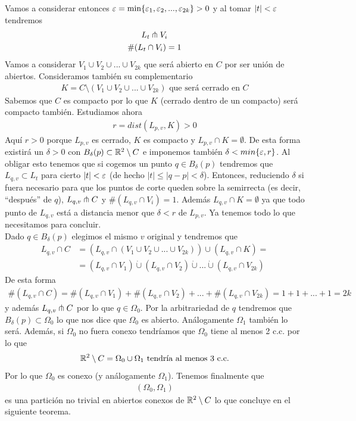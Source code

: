 Vamos a considerar entonces $\varepsilon = \min\{\varepsilon_1, \varepsilon_2, ... , \varepsilon_{2k}\}>0$ y al tomar $|t|<\varepsilon$ tendremos
\begin{gather*}
    L_t \pitchfork V_i\\
    \#(L_t \cap V_i) = 1
\end{gather*}
Vamos a considerar $V_1\cup V_2 \cup ... \cup V_{2k}$ que será abierto en $C$ por ser unión de abiertos. Consideramos también su complementario
\begin{gather*}
    K = C\setminus (V_1\cup V_2 \cup ... \cup V_{2k}) \text{ que será cerrado en $C$}
\end{gather*}
Sabemos que $C$ es compacto por lo que $K$ (cerrado dentro de un compacto) será compacto también. Estudiamos ahora
\begin{gather*}
    r = dist(L_{p,v},K) > 0
\end{gather*}
Aquí $r>0$ porque $L_{p,v}$ es cerrado, $K$ es compacto y $L_{p,v}\cap K=\emptyset$. De esta forma existirá un $\delta>0$ con $B_\delta(p) \subset \mathbb{R}^2 \setminus C$ e imponemos también $\delta < min\{\varepsilon, r\}$. Al obligar esto tenemos que si cogemos un punto $q\in B_\delta(p)$ tendremos que $L_{q,v} \subset L_t$ para cierto $|t| < \varepsilon$ (de hecho $|t|\leq |q-p| < \delta$). Entonces, reduciendo $\delta$ si fuera necesario para que los puntos de corte queden sobre la semirrecta (es decir, ``después'' de $q$), $L_{q,v} \pitchfork C$ y $\#(L_{q,v} \cap V_i) = 1$. Además $L_{q,v} \cap K = \emptyset$ ya que todo punto de $L_{q,v}$ está a distancia menor que $\delta<r$ de $L_{p,v}$. Ya tenemos todo lo que necesitamos para concluir.\\

Dado $q\in B_\delta(p)$ elegimos el mismo $v$ original y tendremos que 
\begin{align*}
    L_{q,v}\cap C &= (L_{q,v} \cap (V_1\cup V_2 \cup ... \cup V_{2k})) \cup (L_{q,v}\cap K) =\\
    &= (L_{q,v} \cap V_1) \dot{\cup} (L_{q,v} \cap V_2) \dot{\cup} ... \dot{\cup} (L_{q,v} \cap V_{2k})
\end{align*}
De esta forma 
\begin{gather*}
    \#(L_{q,v}\cap C) = \#(L_{q,v} \cap V_1) + \#(L_{q,v} \cap V_2) + ... + \#(L_{q,v} \cap V_{2k}) = 1 + 1 + ... + 1 = 2k
\end{gather*}
y además $L_{q,v}\pitchfork C$ por lo que $q\in \Omega_0$. Por la arbitrariedad de $q$ tendremos que $B_\delta(p) \subset \Omega_0$ lo que nos dice que $\Omega_0$ es abierto. Análogamente $\Omega_1$ también lo será. Además, si $\Omega_0$ no fuera conexo tendríamos que $\Omega_0$ tiene al menos 2 c.c. por lo que 
\begin{gather*}
    \mathbb{R}^2 \setminus C = \Omega_0 \cup \Omega_1 \text{ tendría al menos 3 c.c.}
\end{gather*}
Por lo que $\Omega_0$ es conexo (y análogamente $\Omega_1$). Tenemos finalmente que 
\begin{gather*}
    (\Omega_0, \Omega_1)
\end{gather*}
es una partición no trivial en abiertos conexos de $\mathbb{R}^2 \setminus C$ lo que concluye en el siguiente teorema.

